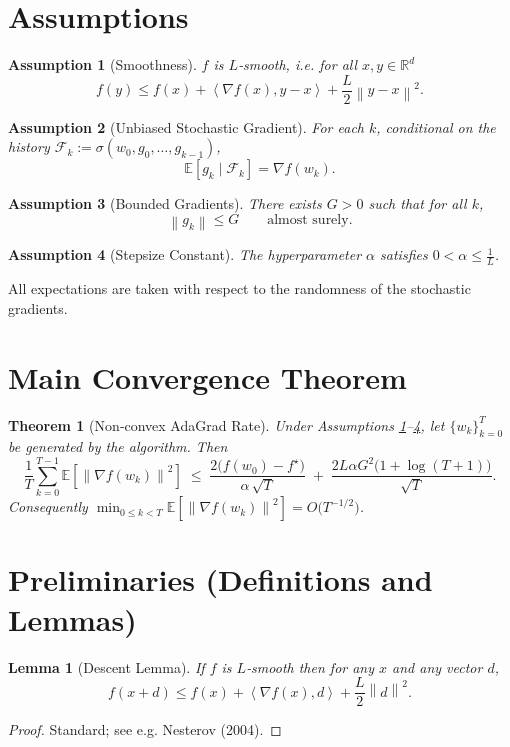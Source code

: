 \documentclass[11pt]{article}
\newtheorem{theorem}{Theorem}
\newtheorem{lemma}{Lemma}
\newtheorem{assumption}{Assumption}
\newcommand{\EE}{\mathbb{E}}
\newcommand{\RR}{\mathbb{R}}
\newcommand{\norm}[1]{\left\|#1\right\|}
\newcommand{\inner}[2]{\left\langle #1,#2 \right\rangle}
\begin{document}
\section*{Assumptions}
\begin{assumption}[Smoothness]\label{ass:smooth}
$f$ is $L$‑smooth, i.e. for all $x,y\in\RR^{d}$
\[
f(y)\le f(x)+\inner{\nabla f(x)}{y-x}+\frac{L}{2}\norm{y-x}^2 .
\]
\end{assumption}
\begin{assumption}[Unbiased Stochastic Gradient]\label{ass:unbiased}
For each $k$, conditional on the history $\mathcal{F}_k:=\sigma(w_0,g_0,\dots,g_{k-1})$,
\[
\EE\!\left[g_k\mid\mathcal{F}_k\right]=\nabla f(w_k).
\]
\end{assumption}
\begin{assumption}[Bounded Gradients]\label{ass:bounded}
There exists $G>0$ such that for all $k$,
\[
\norm{g_k}\le G\qquad\text{almost surely}.
\]
\end{assumption}
\begin{assumption}[Stepsize Constant]\label{ass:alpha}
The hyperparameter $\alpha$ satisfies $0<\alpha\le \frac{1}{L}$.
\end{assumption}

All expectations are taken with respect to the randomness of the stochastic gradients.

\section*{Main Convergence Theorem}
\begin{theorem}[Non‑convex AdaGrad Rate]\label{thm:rate}
Under Assumptions \ref{ass:smooth}–\ref{ass:alpha}, let $\{w_k\}_{k=0}^{T}$ be generated by the algorithm. Then
\[
\frac{1}{T}\sum_{k=0}^{T-1}\EE\!\left[\norm{\nabla f(w_k)}^2\right]
\;\le\;
\frac{2\bigl(f(w_0)-f^\star\bigr)}{\alpha\,\sqrt{T}}
\;+\;
\frac{2L\alpha G^{2}\bigl(1+\log (T+1)\bigr)}{\sqrt{T}} .
\tag{2}
\]
Consequently $\displaystyle\min_{0\le k<T}\EE\!\left[\norm{\nabla f(w_k)}^2\right]=O\!\bigl(T^{-1/2}\bigr)$.
\end{theorem}

\section*{Preliminaries (Definitions and Lemmas)}
\begin{lemma}[Descent Lemma]\label{lem:descent}
If $f$ is $L$‑smooth then for any $x$ and any vector $d$,
\[
f(x+d)\le f(x)+\inner{\nabla f(x)}{d}+\frac{L}{2}\norm{d}^2 .
\]
\end{lemma}
\begin{proof}
Standard; see e.g. Nesterov (2004). \qedhere
\end{proof}
\end{document}
